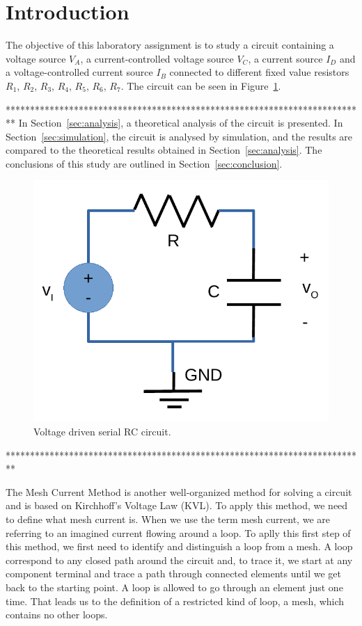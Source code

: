 \section{Introduction}
\label{sec:introduction}

The objective of this laboratory assignment is to study a circuit containing a voltage source $V_A$, a current-controlled voltage source $V_C$, a current source $I_D$ and a voltage-controlled current source $I_B$ connected to different fixed value resistors $R_1$, $R_2$, $R_3$, $R_4$, $R_5$, $R_6$, $R_7$. The circuit can be seen in Figure~\ref{fig:rc}.

**************************************************************************
In Section~\ref{sec:analysis}, a theoretical analysis of the circuit is
presented. In Section~\ref{sec:simulation}, the circuit is analysed by
simulation, and the results are compared to the theoretical results obtained in
Section~\ref{sec:analysis}. The conclusions of this study are outlined in
Section~\ref{sec:conclusion}.

\begin{figure}[h] \centering
\includegraphics[width=0.4\linewidth]{rc.pdf}
\caption{Voltage driven serial RC circuit.}
\label{fig:rc}
\end{figure}
**************************************************************************

The Mesh Current Method is another well-organized method for solving a circuit and is based on Kirchhoff's Voltage Law (KVL). To apply this method, we need to define what mesh current is. When we use the term mesh current, we are referring to an imagined current flowing around a loop. To aplly this first step of this method, we first need to identify and distinguish a loop from a mesh. A loop correspond to any closed path around the circuit and, to trace it, we start at any component terminal and trace a path through connected elements until we get back to the starting point. A loop is allowed to go through an element just one time. That leads us to the definition of a restricted kind of loop, a mesh, which contains no other loops.

